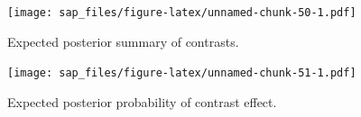 \documentclass[
  bibliography=totoc]{scrreprt}
\begin{document}
\begin{figure}
\centering
\texttt{[image: sap\_files/figure-latex/unnamed-chunk-50-1.pdf]}
\caption{\label{fig:unnamed-chunk-50}Expected posterior summary of contrasts.}
\end{figure}

\begin{figure}
\centering
\texttt{[image: sap\_files/figure-latex/unnamed-chunk-51-1.pdf]}
\caption{\label{fig:unnamed-chunk-51}Expected posterior probability of contrast effect.}
\end{figure}

\renewcommand\refname{References}

\end{document}
